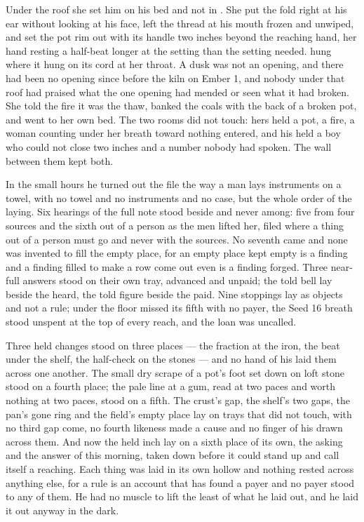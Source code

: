 Under the roof she set him on his bed and not in . She put the fold right at his ear without looking at his face, left the thread at his mouth frozen and unwiped, and set the pot rim out with its handle two inches beyond the reaching hand, her hand resting a half-beat longer at the setting than the setting needed.  hung where it hung on its cord at her throat. A dusk was not an opening, and there had been no opening since before the kiln on Ember 1, and nobody under that roof had praised what the one opening had mended or seen what it had broken. She told the fire it was the thaw, banked the coals with the back of a broken pot, and went to her own bed. The two rooms did not touch: hers held a pot, a fire, a woman counting under her breath toward nothing entered, and his held a boy who could not close two inches and a number nobody had spoken. The wall between them kept both.

In the small hours he turned out the file the way a man lays instruments on a towel, with no towel and no instruments and no case, but the whole order of the laying. Six hearings of the full note stood beside and never among: five from four sources and the sixth out of a person as the men lifted her, filed where a thing out of a person must go and never with the sources. No seventh came and none was invented to fill the empty place, for an empty place kept empty is a finding and a finding filled to make a row come out even is a finding forged. Three near-full answers stood on their own tray, advanced and unpaid; the told bell lay beside the heard, the told figure beside the paid. Nine stoppings lay as objects and not a rule; under the floor  missed its fifth with no payer, the Seed 16 breath stood unspent at the top of every reach, and the loan was uncalled.

Three held changes stood on three places --- the fraction at the iron, the beat under the shelf, the half-check on the stones --- and no hand of his laid them across one another. The small dry scrape of a pot's foot set down on loft stone stood on a fourth place; the pale line at a gum, read at two paces and worth nothing at two paces, stood on a fifth. The crust's gap, the shelf's two gaps, the pan's gone ring and the field's empty place lay on trays that did not touch, with no third gap come, no fourth likeness made a cause and no finger of his drawn across them. And now the held inch lay on a sixth place of its own, the asking and the answer of this morning, taken down before it could stand up and call itself a reaching. Each thing was laid in its own hollow and nothing rested across anything else, for a rule is an account that has found a payer and no payer stood to any of them. He had no muscle to lift the least of what he laid out, and he laid it out anyway in the dark.

